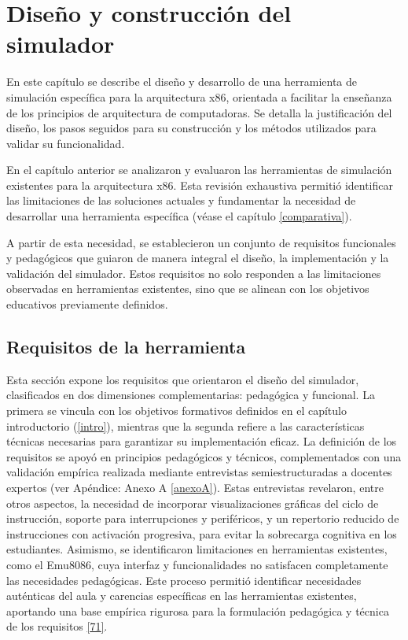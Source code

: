\documentclass[12pt,oneside]{templates/unerthesis}
\begin{document}
\hypertarget{desarrollo}{%
\chapter{Diseño y construcción del simulador}\label{desarrollo}}

En este capítulo se describe el diseño y desarrollo de una herramienta de simulación específica para la arquitectura x86, orientada a facilitar la enseñanza de los principios de arquitectura de computadoras. Se detalla la justificación del diseño, los pasos seguidos para su construcción y los métodos utilizados para validar su funcionalidad.

En el capítulo anterior se analizaron y evaluaron las herramientas de simulación existentes para la arquitectura x86. Esta revisión exhaustiva permitió identificar las limitaciones de las soluciones actuales y fundamentar la necesidad de desarrollar una herramienta específica (véase el capítulo \ref{comparativa}).

A partir de esta necesidad, se establecieron un conjunto de requisitos funcionales y pedagógicos que guiaron de manera integral el diseño, la implementación y la validación del simulador. Estos requisitos no solo responden a las limitaciones observadas en herramientas existentes, sino que se alinean con los objetivos educativos previamente definidos.

\hypertarget{requisitos-de-la-herramienta}{%
\section{Requisitos de la herramienta}\label{requisitos-de-la-herramienta}}

Esta sección expone los requisitos que orientaron el diseño del simulador, clasificados en dos dimensiones complementarias: pedagógica y funcional. La primera se vincula con los objetivos formativos definidos en el capítulo introductorio (\ref{intro}), mientras que la segunda refiere a las características técnicas necesarias para garantizar su implementación eficaz. La definición de los requisitos se apoyó en principios pedagógicos y técnicos, complementados con una validación empírica realizada mediante entrevistas semiestructuradas a docentes expertos (ver Apéndice: Anexo A \ref{anexoA}). Estas entrevistas revelaron, entre otros aspectos, la necesidad de incorporar visualizaciones gráficas del ciclo de instrucción, soporte para interrupciones y periféricos, y un repertorio reducido de instrucciones con activación progresiva, para evitar la sobrecarga cognitiva en los estudiantes. Asimismo, se identificaron limitaciones en herramientas existentes, como el Emu8086, cuya interfaz y funcionalidades no satisfacen completamente las necesidades pedagógicas. Este proceso permitió identificar necesidades auténticas del aula y carencias específicas en las herramientas existentes, aportando una base empírica rigurosa para la formulación pedagógica y técnica de los requisitos \protect\hyperlink{ref-huberman2019qualitative}{{[}71{]}}.
\end{document}
